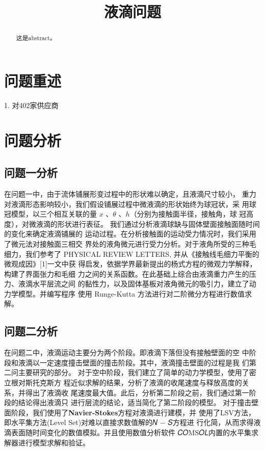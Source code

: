 \documentclass{cumcmthesis}
\title{液滴问题}\tihao{A}
\begin{document}
\maketitle

\begin{abstract}
    这是abstract。

\end{abstract}

\section{问题重述}

1. 对402家供应商\cite{}

\section{问题分析}
\subsection{问题一分析}
在问题一中，由于流体铺展形变过程中的形状难以确定，且液滴尺寸较小，
重力对液滴形态影响较小，我们假设铺展过程中微液滴的形状始终为球冠状，采
用球冠模型，以三个相互关联的量 $x$ 、$\theta$ 、$h$（分别为接触面半径，接触角，球
冠高度），对微液滴的形状进行表征。
我们通过分析液滴球缺与固体壁面接触面随时间的变化来确定液滴铺展的
运动过程。在分析接触面的运动受力情况时，我们采用了微元法对接触面三相交
界处的液角微元进行受力分析。对于液角所受的三种毛细力，我们参考了
PHYSICAL REVIEW LETTERS, 并从《接触线毛细力平衡的微观成因》[1]一文中获
得启发，依据学界最新提出的杨式方程的微观力学解释，构建了界面张力和毛细
力之间的关系函数。在此基础上综合由液滴重力产生的压力、液滴水平层流之间
的黏性力，以及固体基板对液角微元的吸引力，建立了动力学模型。并编写程序
使用 Runge-Kutta 方法进行对二阶微分方程进行数值求解。
\subsection{问题二分析}
在问题二中，液滴运动主要分为两个阶段。即液滴下落但没有接触壁面的空
中阶段和液滴以一定速度撞击壁面的撞击阶段。其中，液滴撞击壁面的过程是我
们第二问主要研究的部分。
对于空中阶段，我们建立了简单的动力学模型，使用了密立根对斯托克斯方
程近似求解的结果，分析了液滴的收尾速度与释放高度的关系，并得出了液滴收
尾速度最大值。此后，分析第二阶段之前，我们通过第一阶段的结论得出液滴只
进行层流的结论，适当简化了第二阶段的模型。
对于撞击壁面阶段，我们使用了\textbf{Navier-Stokes}方程对液滴进行建模，并
使用了LSV方法，即水平集方法(Level Set)对难以直接求数值解的𝑁 − 𝑆方程进
行化简，从而求得液滴表面随时间变化的数值模拟。并且使用数值分析软件
𝐶𝑂MS𝑂𝐿内置的水平集求解器进行模型求解和验证。
\end{document}
